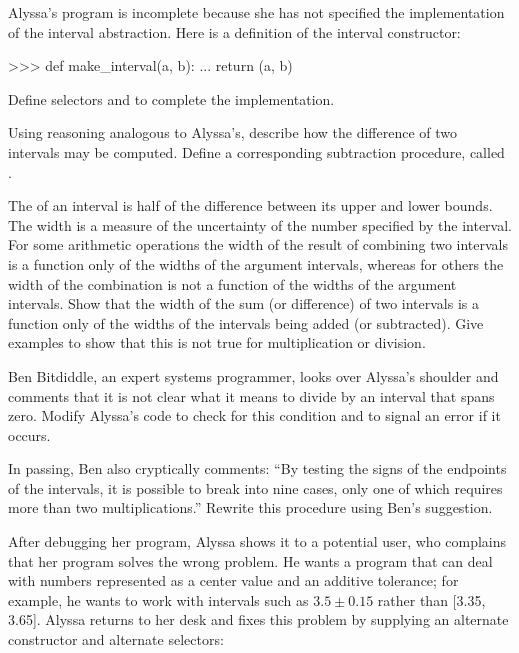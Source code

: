 \begin{exerciseGroup}
\label{Exercise 2.7}
 Alyssa's program is incomplete
because she has not specified the implementation of the interval abstraction.
Here is a definition of the interval constructor:

\begin{codeBlock}
>>> def make_interval(a, b):
...     return (a, b)
\end{codeBlock}

Define selectors  and  to complete the
implementation.

\label{Exercise 2.8}
 Using reasoning analogous to
Alyssa's, describe how the difference of two intervals may be computed.  Define
a corresponding subtraction procedure, called .

\label{Exercise 2.9}
 The  of an interval
is half of the difference between its upper and lower bounds.  The width is a
measure of the uncertainty of the number specified by the interval.  For some
arithmetic operations the width of the result of combining two intervals is a
function only of the widths of the argument intervals, whereas for others the
width of the combination is not a function of the widths of the argument
intervals.  Show that the width of the sum (or difference) of two intervals is
a function only of the widths of the intervals being added (or subtracted).
Give examples to show that this is not true for multiplication or division.

\label{Exercise 2.10}
 Ben Bitdiddle, an expert systems
programmer, looks over Alyssa's shoulder and comments that it is not clear what
it means to divide by an interval that spans zero.  Modify Alyssa's code to
check for this condition and to signal an error if it occurs.

\label{Exercise 2.11}
 In passing, Ben also cryptically
comments: ``By testing the signs of the endpoints of the intervals, it is
possible to break  into nine cases, only one of which
requires more than two multiplications.''  Rewrite this procedure using Ben's
suggestion.

After debugging her program, Alyssa shows it to a potential user, who complains
that her program solves the wrong problem.  He wants a program that can deal
with numbers represented as a center value and an additive tolerance; for
example, he wants to work with intervals such as \( 3.5 \pm 0.15 \) rather than
[3.35, 3.65].  Alyssa returns to her desk and fixes this problem by supplying
an alternate constructor and alternate selectors:


\end{exerciseGroup}
